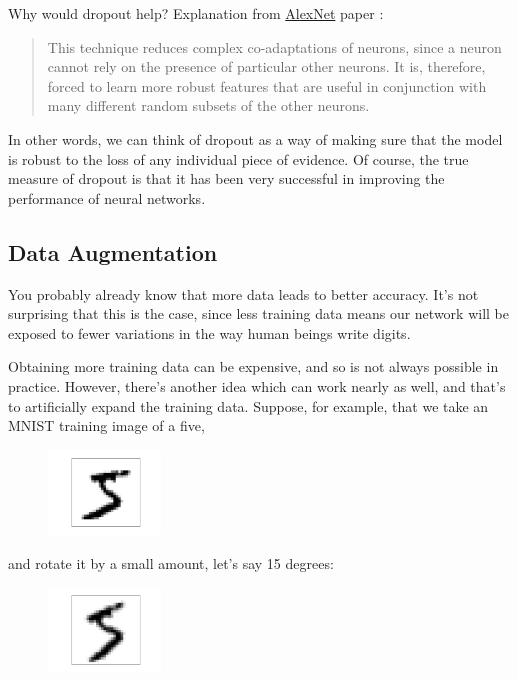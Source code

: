 \documentclass[a4paper]{tufte-handout}
\begin{document}
Why would dropout help? Explanation from
\href{https://papers.nips.cc/paper/4824-imagenet-classification-with-deep-convolutional-neural-networks.pdf}{AlexNet}
paper :

\begin{quote}
This technique reduces complex co-adaptations of neurons, since a neuron
cannot rely on the presence of particular other neurons. It is,
therefore, forced to learn more robust features that are useful in
conjunction with many different random subsets of the other neurons.
\end{quote}

In other words, we can think of dropout as a way of making sure that the
model is robust to the loss of any individual piece of evidence. Of
course, the true measure of dropout is that it has been very successful
in improving the performance of neural networks.

\subsection{Data Augmentation}\label{data-augmentation}

You probably already know that more data leads to better accuracy. It's
not surprising that this is the case, since less training data means our
network will be exposed to fewer variations in the way human beings
write digits.

Obtaining more training data can be expensive, and so is not always
possible in practice. However, there's another idea which can work
nearly as well, and that's to artificially expand the training data.
Suppose, for example, that we take an MNIST training image of a five,

\begin{figure}
  \includegraphics[width=30mm]{more_data_5.png}
\end{figure}

and rotate it by a small amount, let's say 15 degrees:

\begin{figure}
  \includegraphics[width=30mm]{more_data_rotated_5.png}
\end{figure}
\end{document}
